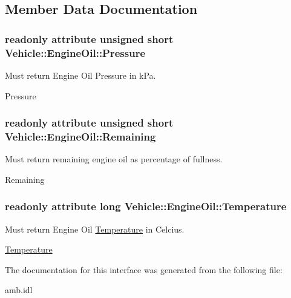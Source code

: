 \subsection{Member Data Documentation}
\hypertarget{interfaceVehicle_1_1EngineOil_a9da192a4b8b3364e121595d8be8dd802}{
\subsubsection[{Pressure}]{\setlength{\rightskip}{0pt plus 5cm}readonly attribute unsigned short Vehicle\-::\-Engine\-Oil\-::\-Pressure}}\label{interfaceVehicle_1_1EngineOil_a9da192a4b8b3364e121595d8be8dd802}


Must return Engine Oil Pressure in k\-Pa. 

Pressure \hypertarget{interfaceVehicle_1_1EngineOil_a8ec4d786322d1a340aed509440163d9a}{
\subsubsection[{Remaining}]{\setlength{\rightskip}{0pt plus 5cm}readonly attribute unsigned short Vehicle\-::\-Engine\-Oil\-::\-Remaining}}\label{interfaceVehicle_1_1EngineOil_a8ec4d786322d1a340aed509440163d9a}


Must return remaining engine oil as percentage of fullness. 

Remaining \hypertarget{interfaceVehicle_1_1EngineOil_ac6d334def81cd936b962933e07becee1}{
\subsubsection[{Temperature}]{\setlength{\rightskip}{0pt plus 5cm}readonly attribute long Vehicle\-::\-Engine\-Oil\-::\-Temperature}}\label{interfaceVehicle_1_1EngineOil_ac6d334def81cd936b962933e07becee1}


Must return Engine Oil \hyperlink{interfaceVehicle_1_1Temperature}{Temperature} in Celcius. 

\hyperlink{interfaceVehicle_1_1Temperature}{Temperature} 

The documentation for this interface was generated from the following file\-:\begin{DoxyCompactItemize}
\item 
amb.\-idl\end{DoxyCompactItemize}
